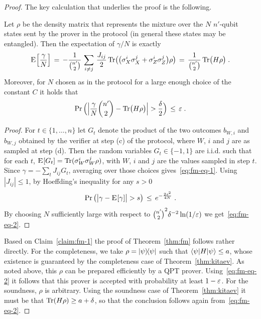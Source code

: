 \begin{proof}
The key calculation that underlies the proof is the following. 

\begin{claim}\label{claim:fm-1}
Let $\rho$ be the density matrix that represents the mixture over the $N$ $n'$-qubit states sent by the prover in the protocol (in general these states may be entangled). Then the expectation of $\gamma/N$ is exactly
\begin{equation}\label{eq:fm-eq-1}
\textsc{E}_{} \Big[ \frac{\gamma}{N} \Big] \,=\, -\frac{1}{ {n' \choose 2}} \,\sum_{i\neq j}\, \frac{J_{ij}}{2} \,\mbox{\rm Tr}\big(\big(\sigma_X^i \sigma_X^j + \sigma_Z^i \sigma_Z^j\big)\rho\big)\,=\, \frac{1}{ {n' \choose 2}}\, \mbox{\rm Tr}\big(H\rho\big)\;.
\end{equation}
Moreover, for $N$ chosen as in the protocol for a large enough choice of the constant $C$ it holds that
\begin{equation}\label{eq:fm-eq-2}
\Pr\Big( \Big|\frac{\gamma}{N} {n'\choose 2} - \Tr\big(H\rho\big)\Big|> \frac{\delta}{2} \Big) \,\leq \,\eps\;.
\end{equation}
\end{claim} 

\begin{proof}
For $t\in\{1,\ldots,n\}$ let $G_t$ denote the product of the two outcomes $b_{W,i}$ and $b_{W,j}$ obtained by the verifier at step (c) of the protocol, where $W$, $i$ and $j$ are as sampled at step (d). Then the random variables $G_t \in \{-1,1\}$ are i.i.d. such that for each $t$, $\textsc{E}_{}[G_t]= \mbox{\rm Tr}(\sigma_W^i \sigma_W^j \rho)$, with $W$, $i$ and $j$ are the values sampled in step $t$. Since $\gamma = - \sum_t J_{ij} G_t$, averaging over those choices gives~\eqref{eq:fm-eq-1}. Using $|J_{ij}|\leq 1$, by Hoeffding's inequality for any $s>0$
\[ \Pr\big( \big|\gamma - \textsc{E}_{}[\gamma]\big| > s \big) \,\leq \, e^{-\frac{2  s^2 }{ 4N}}\;.\]
By choosing $N$ sufficiently large with respect to ${n' \choose 2}^2\delta^{-2}\ln(1/\varepsilon)$ we get~\eqref{eq:fm-eq-2}.
\end{proof}

Based on Claim~\ref{claim:fm-1} the proof of Theorem~\ref{thm:fm} follows rather directly. For the completeness, we take $\rho = |\psi\rangle\!\langle\psi|$ such that $\langle\psi| H |\psi\rangle \leq a$, whose existence is guaranteed by the completeness case of Theorem~\ref{thm:kitaev}. As noted above, this $\rho$ can be prepared efficiently by a QPT prover. Using~\eqref{eq:fm-eq-2} it follows that this prover is accepted with probability at least $1-\varepsilon$. For the soundness, $\rho$ is arbitrary. Using the soundness case of Theorem~\ref{thm:kitaev} it must be that $\mbox{\rm Tr}(H\rho) \geq a+\delta$, so that the conclusion follows again from~\eqref{eq:fm-eq-2}. 
\end{proof}




